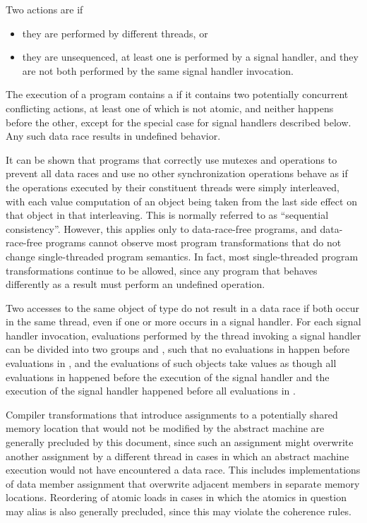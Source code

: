 \pnum
Two actions are  if
\begin{itemize}
\item they are performed by different threads, or
\item they are unsequenced, at least one is performed by a signal handler, and
they are not both performed by the same signal handler invocation.
\end{itemize}
The execution of a program contains a  if it contains two
potentially concurrent conflicting actions, at least one of which is not atomic,
and neither happens before the other,
except for the special case for signal handlers described below.
Any such data race results in undefined
behavior.
\begin{note}
It can be shown that programs that correctly use mutexes
and  operations to prevent all data races and use no
other synchronization operations behave as if the operations executed by their
constituent threads were simply interleaved, with each
%
value computation of an
object being taken from the last
%
side effect on that object in that
interleaving. This is normally referred to as ``sequential consistency''.
However, this applies only to data-race-free programs, and data-race-free
programs cannot observe most program transformations that do not change
single-threaded program semantics. In fact, most single-threaded program
transformations continue to be allowed, since any program that behaves
differently as a result must perform an undefined operation.
\end{note}

\pnum
Two accesses to the same object of type  do not
result in a data race if both occur in the same thread, even if one or more
occurs in a signal handler. For each signal handler invocation, evaluations
performed by the thread invoking a signal handler can be divided into two
groups  and , such that no evaluations in
 happen before evaluations in , and the
evaluations of such  objects take values as though
all evaluations in  happened before the execution of the signal
handler and the execution of the signal handler happened before all evaluations
in .

\pnum
\begin{note}
Compiler transformations that introduce assignments to a potentially
shared memory location that would not be modified by the abstract machine are
generally precluded by this document, since such an assignment might overwrite
another assignment by a different thread in cases in which an abstract machine
execution would not have encountered a data race. This includes implementations
of data member assignment that overwrite adjacent members in separate memory
locations. Reordering of atomic loads in cases in which the atomics in question
may alias is also generally precluded, since this may violate the coherence
rules.
\end{note}

